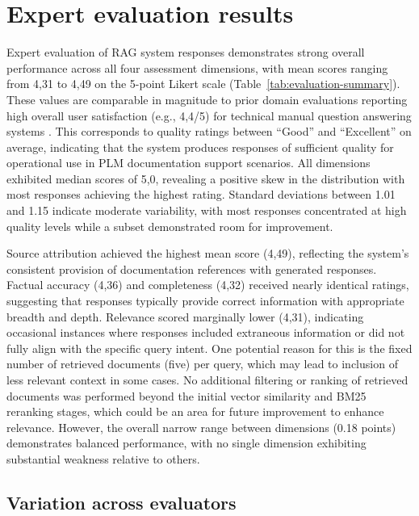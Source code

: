 \section{Expert evaluation results}
\label{sec:expert-evaluation-results}

Expert evaluation of RAG system responses demonstrates strong overall performance across all four assessment dimensions, with mean scores ranging from 4,31 to 4,49 on the 5-point Likert scale (Table~\ref{tab:evaluation-summary}). These values are comparable in magnitude to prior domain evaluations reporting high overall user satisfaction (e.g., 4,4/5) for technical manual question answering systems \parencite{namLoRATunedMultimodalRAG2025}. This corresponds to quality ratings between ``Good'' and ``Excellent'' on average, indicating that the system produces responses of sufficient quality for operational use in PLM documentation support scenarios. All dimensions exhibited median scores of 5,0, revealing a positive skew in the distribution with most responses achieving the highest rating. Standard deviations between 1.01 and 1.15 indicate moderate variability, with most responses concentrated at high quality levels while a subset demonstrated room for improvement.

Source attribution achieved the highest mean score (4,49), reflecting the system's consistent provision of documentation references with generated responses. Factual accuracy (4,36) and completeness (4,32) received nearly identical ratings, suggesting that responses typically provide correct information with appropriate breadth and depth. Relevance scored marginally lower (4,31), indicating occasional instances where responses included extraneous information or did not fully align with the specific query intent. One potential reason for this is the fixed number of retrieved documents (five) per query, which may lead to inclusion of less relevant context in some cases. No additional filtering or ranking of retrieved documents was performed beyond the initial vector similarity and BM25 reranking stages, which could be an area for future improvement to enhance relevance. However, the overall narrow range between dimensions (0.18 points) demonstrates balanced performance, with no single dimension exhibiting substantial weakness relative to others.

\subsection{Variation across evaluators}
\label{subsec:evaluator-variation}

